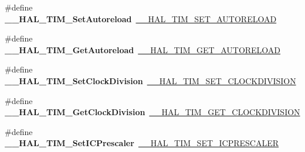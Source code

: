 \begin{DoxyCompactItemize}
\item 
\hypertarget{group___h_a_l___t_i_m___aliased___macros_ga8857297381807be432e6b6eb98fdb591}{\#define {\bfseries \-\_\-\-\_\-\-H\-A\-L\-\_\-\-T\-I\-M\-\_\-\-Set\-Autoreload}~\hyperlink{group___t_i_m___exported___macros_ga1e6300cab1e34ecaaf490dc7d4812d69}{\-\_\-\-\_\-\-H\-A\-L\-\_\-\-T\-I\-M\-\_\-\-S\-E\-T\-\_\-\-A\-U\-T\-O\-R\-E\-L\-O\-A\-D}}\label{group___h_a_l___t_i_m___aliased___macros_ga8857297381807be432e6b6eb98fdb591}

\item 
\hypertarget{group___h_a_l___t_i_m___aliased___macros_gae96afd3a280ee1faf2551537e6618ee4}{\#define {\bfseries \-\_\-\-\_\-\-H\-A\-L\-\_\-\-T\-I\-M\-\_\-\-Get\-Autoreload}~\hyperlink{group___t_i_m___exported___macros_gaa7a5c7645695bad15bacd402513a028a}{\-\_\-\-\_\-\-H\-A\-L\-\_\-\-T\-I\-M\-\_\-\-G\-E\-T\-\_\-\-A\-U\-T\-O\-R\-E\-L\-O\-A\-D}}\label{group___h_a_l___t_i_m___aliased___macros_gae96afd3a280ee1faf2551537e6618ee4}

\item 
\hypertarget{group___h_a_l___t_i_m___aliased___macros_ga8b8f3cf144c4058ec55e6e3659c6a68f}{\#define {\bfseries \-\_\-\-\_\-\-H\-A\-L\-\_\-\-T\-I\-M\-\_\-\-Set\-Clock\-Division}~\hyperlink{group___t_i_m___exported___macros_ga8aa84d77c670890408092630f9b2bdc4}{\-\_\-\-\_\-\-H\-A\-L\-\_\-\-T\-I\-M\-\_\-\-S\-E\-T\-\_\-\-C\-L\-O\-C\-K\-D\-I\-V\-I\-S\-I\-O\-N}}\label{group___h_a_l___t_i_m___aliased___macros_ga8b8f3cf144c4058ec55e6e3659c6a68f}

\item 
\hypertarget{group___h_a_l___t_i_m___aliased___macros_gaaf835e3864f2ba2e2026d417ad0d5e40}{\#define {\bfseries \-\_\-\-\_\-\-H\-A\-L\-\_\-\-T\-I\-M\-\_\-\-Get\-Clock\-Division}~\hyperlink{group___t_i_m___exported___macros_gae6bc91bb5940bce52828c690f24001b8}{\-\_\-\-\_\-\-H\-A\-L\-\_\-\-T\-I\-M\-\_\-\-G\-E\-T\-\_\-\-C\-L\-O\-C\-K\-D\-I\-V\-I\-S\-I\-O\-N}}\label{group___h_a_l___t_i_m___aliased___macros_gaaf835e3864f2ba2e2026d417ad0d5e40}

\item 
\hypertarget{group___h_a_l___t_i_m___aliased___macros_ga1cb3c9854441539ebe076fba62c36d22}{\#define {\bfseries \-\_\-\-\_\-\-H\-A\-L\-\_\-\-T\-I\-M\-\_\-\-Set\-I\-C\-Prescaler}~\hyperlink{group___t_i_m___exported___macros_gaeb106399b95ef02cec502f58276a0e92}{\-\_\-\-\_\-\-H\-A\-L\-\_\-\-T\-I\-M\-\_\-\-S\-E\-T\-\_\-\-I\-C\-P\-R\-E\-S\-C\-A\-L\-E\-R}}\label{group___h_a_l___t_i_m___aliased___macros_ga1cb3c9854441539ebe076fba62c36d22}


\end{DoxyCompactItemize}
